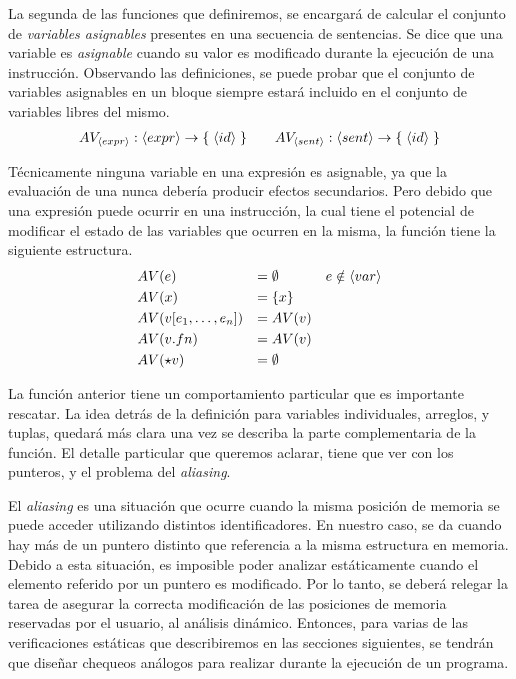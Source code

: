 \documentclass{article}
\begin{document}
La segunda de las funciones que definiremos, se encargará de calcular el conjunto de \textit{variables asignables} presentes en una secuencia de sentencias.
Se dice que una variable es \textit{asignable} cuando su valor es modificado durante la ejecución de una instrucción.
Observando las definiciones, se puede probar que el conjunto de variables asignables en un bloque siempre estará incluido en el conjunto de variables libres del mismo.
\begin{gather*}
AV_{\langle expr \rangle}: \langle expr \rangle \rightarrow \{ \; \langle id \rangle \; \}
\qquad
AV_{\langle sent \rangle}: \langle sent \rangle \rightarrow \{ \; \langle id \rangle \; \}
\end{gather*}

Técnicamente ninguna variable en una expresión es asignable, ya que la evaluación de una nunca debería producir efectos secundarios.
Pero debido que una expresión puede ocurrir en una instrucción, la cual tiene el potencial de modificar el estado de las variables que ocurren en la misma, la función tiene la siguiente estructura.
\begin{align*}
&AV(e)
&=&\;
\emptyset
&e \notin \langle var \rangle
\\
&AV(x)
&=&\;
\{ x \}
\\
&AV(v [e_1, \ldots, e_n])
&=&\;
AV(v)
\\
&AV(v.fn)
&=&\;
AV(v)
\\
&AV(\star v)
&=&\;
\emptyset
\end{align*}

La función anterior tiene un comportamiento particular que es importante rescatar.
La idea detrás de la definición para variables individuales, arreglos, y tuplas, quedará más clara una vez se describa la parte complementaria de la función.
El detalle particular que queremos aclarar, tiene que ver con los punteros, y el problema del \textit{aliasing}.

El \textit{aliasing} es una situación que ocurre cuando la misma posición de memoria se puede acceder utilizando distintos identificadores.
En nuestro caso, se da cuando hay más de un puntero distinto que referencia a la misma estructura en memoria.
Debido a esta situación, es imposible poder analizar estáticamente cuando el elemento referido por un puntero es modificado.
Por lo tanto, se deberá relegar la tarea de asegurar la correcta modificación de las posiciones de memoria reservadas por el usuario, al análisis dinámico.
Entonces, para varias de las verificaciones estáticas que describiremos en las secciones siguientes, se tendrán que diseñar chequeos análogos para realizar durante la ejecución de un programa.
\end{document}
